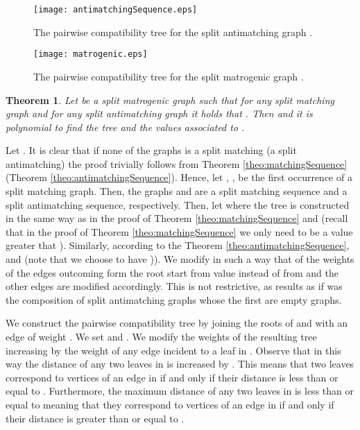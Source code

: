 \documentclass[dvipdfm]{llncs}
\newtheorem{Theorem}{Theorem}
\begin{document}
\begin{figure}[!ht]
  \begin{center}
\texttt{[image: antimatchingSequence.eps]}
  \end{center}
\caption{\footnotesize{The pairwise compatibility tree for the split antimatching graph . }}
\label{fig:antimatchingsequence}
\end{figure}



\begin{figure}[!ht]
  \begin{center}
\texttt{[image: matrogenic.eps]}
  \end{center}
\caption{\footnotesize{The pairwise compatibility tree for the split matrogenic graph . }}
\label{fig:matchingAntimatching}
\end{figure}


\begin{Theorem}
Let  be a split matrogenic graph such that for any split matching graph  and for any split antimatching graph  it holds  that . Then  and it is polynomial to find the tree and the values  associated to .
\end{Theorem}
\proof
Let . It is clear that if none of the graphs  is a split matching (a split antimatching) the proof trivially follows from Theorem \ref{theo:matchingSequence} (Theorem \ref{theo:antimatchingSequence}). Hence, let , , be the first occurrence of a split matching graph. Then, the graphs  and  are a split matching sequence and a split antimatching sequence, respectively.
Then, let  where the tree is constructed in the same way as in the proof of Theorem \ref{theo:matchingSequence} and  (recall that in the proof of Theorem \ref{theo:matchingSequence}  we only need  to be a value greater that ). Similarly, according to the Theorem  \ref{theo:antimatchingSequence},  and  (note that we choose to have )). We modify  in such a way that of the weights of the edges outcoming form the root start from value  instead of from  and the other edges are modified accordingly. This is not restrictive, as  results as if  was the composition of  split antimatching graphs whose the first  are empty graphs.



We construct the pairwise compatibility tree  by joining the roots of  and  with an edge of weight . We set  and . We modify the weights of the resulting tree increasing by  the weight of any edge incident to a leaf in .  Observe that in this way the distance of any two leaves in  is increased by . This means that two leaves correspond to vertices of an edge in  if and only if their distance is less than or equal to . Furthermore, the maximum distance of any two leaves in  is less than or equal to  meaning that they correspond to vertices of an edge in  if and only if their distance is greater than or equal to . 
\end{document}
